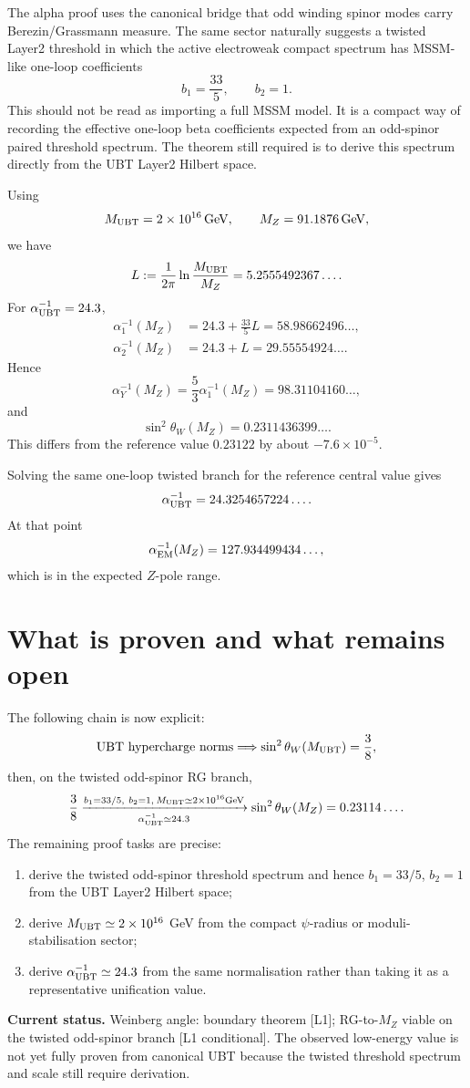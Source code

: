 \documentclass[12pt,a4paper]{article}
\begin{document}
The alpha proof uses the canonical bridge that odd winding spinor modes carry
Berezin/Grassmann measure.  The same sector naturally suggests a twisted
Layer2 threshold in which the active electroweak compact spectrum has
MSSM-like one-loop coefficients
\[
  b_1=\frac{33}{5},
  \qquad
  b_2=1.
\]
This should not be read as importing a full MSSM model.  It is a compact way of
recording the effective one-loop beta coefficients expected from an odd-spinor
paired threshold spectrum.  The theorem still required is to derive this
spectrum directly from the UBT Layer2 Hilbert space.

Using
\[
  M_{\rm UBT}=2\times10^{16}\,{\rm GeV},
  \qquad
  M_Z=91.1876\,{\rm GeV},
\]
we have
\[
  L:=\frac{1}{2\pi}\ln\frac{M_{\rm UBT}}{M_Z}=5.2555492367\ldots.
\]
For $\alpha_{\rm UBT}^{-1}=24.3$,
\begin{align}
  \alpha_1^{-1}(M_Z)&=24.3+\frac{33}{5}L=58.98662496\ldots,\\
  \alpha_2^{-1}(M_Z)&=24.3+L=29.55554924\ldots.
\end{align}
Hence
\[
  \alpha_Y^{-1}(M_Z)=\frac53\alpha_1^{-1}(M_Z)=98.31104160\ldots,
\]
and
\[
  \boxed{
  \sin^2\theta_W(M_Z)=0.2311436399\ldots
  }.
\]
This differs from the reference value $0.23122$ by about
$-7.6\times10^{-5}$.

Solving the same one-loop twisted branch for the reference central value gives
\[
  \alpha_{\rm UBT}^{-1}=24.3254657224\ldots.
\]
At that point
\[
  \alpha_{\rm EM}^{-1}(M_Z)=127.934499434\ldots,
\]
which is in the expected $Z$-pole range.

\section{What is proven and what remains open}

The following chain is now explicit:
\[
  \text{UBT hypercharge norms}
  \Longrightarrow
  \sin^2\theta_W(M_{\rm UBT})=\frac38,
\]
then, on the twisted odd-spinor RG branch,
\[
  \frac38
  \xrightarrow[\alpha_{\rm UBT}^{-1}\simeq24.3]
  {b_1=33/5,\ b_2=1,\\ M_{\rm UBT}\simeq2\times10^{16}{\rm GeV}}
  \sin^2\theta_W(M_Z)=0.23114\ldots.
\]
The remaining proof tasks are precise:
\begin{enumerate}
  \item derive the twisted odd-spinor threshold spectrum and hence
  $b_1=33/5$, $b_2=1$ from the UBT Layer2 Hilbert space;
  \item derive $M_{\rm UBT}\simeq2\times10^{16}$ GeV from the compact
  $\psi$-radius or moduli-stabilisation sector;
  \item derive $\alpha_{\rm UBT}^{-1}\simeq24.3$ from the same normalisation
  rather than taking it as a representative unification value.
\end{enumerate}

\begin{statusbox}
\textbf{Current status.}  Weinberg angle: boundary theorem [L1]; RG-to-$M_Z$
viable on the twisted odd-spinor branch [L1 conditional].  The observed
low-energy value is not yet fully proven from canonical UBT because the twisted
threshold spectrum and scale still require derivation.
\end{statusbox}
\end{document}

